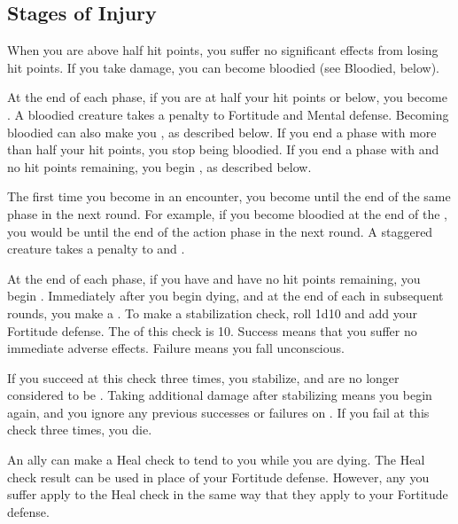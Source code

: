     \subsection{Stages of Injury}

         When you are above half hit points, you suffer no significant effects from losing hit points.
        If you take damage, you can become bloodied (see Bloodied, below).

         At the end of each phase, if you are at half your hit points or below, you become .
        A bloodied creature takes a  penalty to Fortitude and Mental defense.
        Becoming bloodied can also make you , as described below.
        If you end a phase with more than half your hit points, you stop being bloodied.
        If you end a phase with  and no hit points remaining, you begin , as described below.

        \label{Staggered}
        The first time you become  in an encounter, you become  until the end of the same phase in the next round.
        For example, if you become bloodied at the end of the , you would be  until the end of the action phase in the next round.
        A staggered creature takes a  penalty to  and .

        \label{Dying} At the end of each phase, if you have  and have no hit points remaining, you begin .
        Immediately after you begin dying, and at the end of each  in subsequent rounds, you make a .
        To make a stabilization check, roll 1d10 and add your Fortitude defense.
        The  of this check is 10.
        Success means that you suffer no immediate adverse effects.
        Failure means you fall unconscious.

        If you succeed at this check three times, you stabilize, and are no longer considered to be .
        Taking additional damage after stabilizing means you begin  again, and you ignore any previous successes or failures on .
        If you fail at this check three times, you die.

        An ally can make a Heal check to tend to you while you are dying.
        The Heal check result can be used in place of your Fortitude defense.
        However, any  you suffer apply to the Heal check in the same way that they apply to your Fortitude defense.

